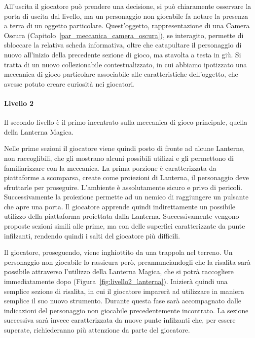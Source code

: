 All’uscita il giocatore può prendere una decisione, si può chiaramente osservare la porta di uscita dal livello, ma un personaggio non giocabile fa notare la presenza a terra di un oggetto particolare. Quest’oggetto, rappresentazione di una Camera Oscura (Capitolo~\ref{par_meccanica_camera_oscura}), se interagito, permette di sbloccare la relativa scheda informativa, oltre che catapultare il personaggio di nuovo all’inizio della precedente sezione di gioco, ma stavolta a testa in giù. Si tratta di un nuovo collezionabile contestualizzato, in cui abbiamo ipotizzato una meccanica di gioco particolare associabile alle caratteristiche dell’oggetto, che avesse potuto creare curiosità nei giocatori.

\paragraph{Livello 2}
\label{par:livello2}

Il secondo livello è il primo incentrato sulla meccanica di gioco principale, quella della Lanterna Magica.

Nelle prime sezioni il giocatore viene quindi posto di fronte ad alcune Lanterne, non raccoglibili, che gli mostrano alcuni possibili utilizzi e gli permettono di familiarizzare con la meccanica.
La prima porzione è caratterizzata da piattaforme a scomparsa, create come proiezioni di Lanterna, il personaggio deve sfruttarle per proseguire. L’ambiente è assolutamente sicuro e privo di pericoli. Successivamente la proiezione permette ad un nemico di raggiungere un pulsante che apre una porta. Il giocatore apprende quindi indirettamente un possibile utilizzo della piattaforma proiettata dalla Lanterna. Successivamente vengono proposte sezioni simili alle prime, ma con delle superfici caratterizzate da punte infilzanti, rendendo quindi i salti del giocatore più difficili.

Il giocatore, proseguendo, viene inghiottito da una trappola nel terreno. Un personaggio non giocabile lo rassicura però, preannunciandogli che la risalita sarà possibile attraverso l’utilizzo della Lanterna Magica, che si potrà raccogliere immediatamente dopo (Figura~\ref{fig:livello2_lanterna}). Inizierà quindi una semplice sezione di risalita, in cui il giocatore imparerà ad utilizzare in maniera semplice il suo nuovo strumento. Durante questa fase sarà accompagnato dalle indicazioni del personaggio non giocabile precedentemente incontrato. La sezione successiva sarà invece caratterizzata da nuove punte infilzanti che, per essere superate, richiederanno più attenzione da parte del giocatore.

